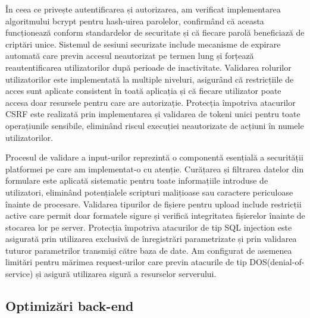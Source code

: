 \documentclass[12pt,a4paper]{report}
\begin{document}
În ceea ce privește autentificarea și autorizarea, am verificat  implementarea algoritmului bcrypt pentru hash-uirea parolelor, confirmând că aceasta funcționează conform standardelor de securitate și că fiecare parolă beneficiază de criptări unice. Sistemul de sesiuni securizate include mecanisme de expirare automată care previn accesul neautorizat pe termen lung și forțează reautentificarea utilizatorilor după perioade de inactivitate. Validarea rolurilor utilizatorilor este implementată la multiple niveluri, asigurând că restricțiile de acces sunt aplicate consistent în toată aplicația și că fiecare utilizator poate accesa doar resursele pentru care are autorizație. Protecția împotriva atacurilor CSRF este realizată prin implementarea și validarea de tokeni unici pentru toate operațiunile sensibile, eliminând riscul execuției neautorizate de acțiuni în numele utilizatorilor.

Procesul de validare a input-urilor reprezintă o componentă esențială a securității platformei  pe care am implementat-o cu atenție. Curățarea și filtrarea datelor din formulare este aplicată sistematic pentru toate informațiile introduse de utilizatori, eliminând potențialele scripturi malițioase sau caractere periculoase înainte de procesare. Validarea tipurilor de fișiere pentru upload include restricții active care permit doar formatele sigure și verifică integritatea fișierelor înainte de stocarea lor pe server. Protecția împotriva atacurilor de tip SQL injection este asigurată prin utilizarea exclusivă de înregistrări parametrizate și prin validarea  tuturor parametrilor transmiși către baza de date. Am configurat de asemenea limitări pentru mărimea request-urilor care previn atacurile de tip DOS(denial-of-service) și asigură utilizarea sigură a resurselor serverului.


\subsection{Optimizări back-end}
\end{document}
